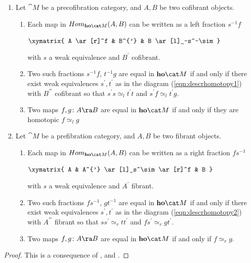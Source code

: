 \begin{thm}
\label{thm::descrhomot}
\mbox{}
\begin{enumerate}
\item
Let ${\cat M}$ be a precofibration category, and $A, B$ be two cofibrant objects.
\begin{enumerate}
\item
Each map in $Hom_{{\bf ho}{\cat M}} (A, B)$ can be written as a left fraction $s^{-1}f$
\begin{center}
$\xymatrix{ A \ar[r]^f & B^{'} & B \ar[l]_-s^-\sim
  }$
\end{center}
with $s$ a weak equivalence and $B^{'}$ cofibrant. 
\item
Two such fractions $s^{-1}f$, $t^{-1}g$ are equal in ${\bf ho}{\cat M}$ if and only if there exist weak equivalences $s^{'}, t^{'}$ as in the diagram (\ref{eqn:descrhomotopy1}) with $B^{'''}$ cofibrant so that $s^{'}s \simeq_l t^{'}t$ and $s^{'}f \simeq_l t^{'}g$.
\item
Two maps $f, g \colon A \ra B$ are equal in ${\bf ho}{\cat M}$ if and only if they are homotopic $f \simeq_l g$
\end{enumerate}
\item
Let ${\cat M}$ be a prefibration category, and $A, B$ be two fibrant objects.
\begin{enumerate}
\item
Each map in $Hom_{{\bf ho}{\cat M}} (A, B)$ can be written as a right fraction $fs^{-1}$
\begin{center}
$\xymatrix{ A & A^{'} \ar[l]_s^\sim \ar[r]^f & B
  }$
\end{center}
with $s$ a weak equivalence and $A^{'}$ fibrant. 
\item
Two such fractions $fs^{-1}$, $gt^{-1}$ are equal in ${\bf ho}{\cat M}$ if and only if there exist weak equivalences $s^{'}, t^{'}$ as in the diagram (\ref{eqn:descrhomotopy2}) with $A^{'''}$ fibrant so that $ss^{'} \simeq_r tt^{'}$ and $fs^{'} \simeq_r gt^{'}$.
\item
Two maps $f, g \colon A \ra B$ are equal in ${\bf ho}{\cat M}$ if and only if $f \simeq_r g$.
\end{enumerate}
\end{enumerate}
\end{thm}

\begin{proof}
This is a consequence of ,  and . 
\end{proof}


